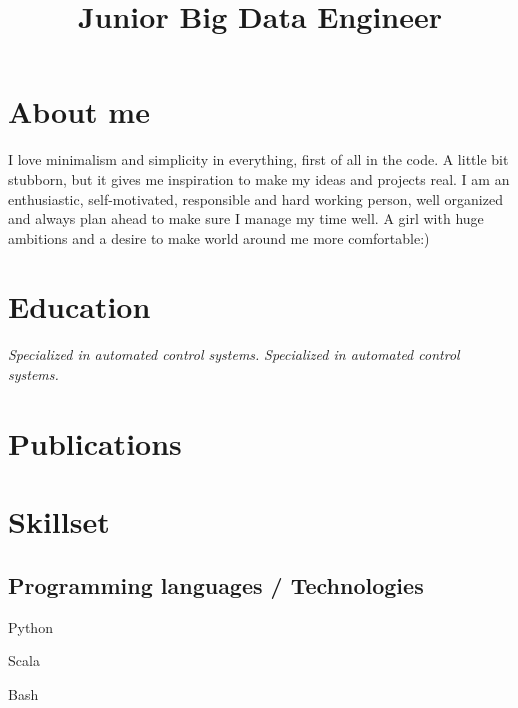 \documentclass[12pt,a4paper,sans]{moderncv}        %
\title{Junior Big Data Engineer}                               %
\begin{document}
\makecvtitle
\section{About me}
\textcolor{color1}{I love minimalism and simplicity in everything, first of all in the code. A little bit stubborn, but it gives me inspiration to make my ideas and projects real. I am an enthusiastic, self-motivated, responsible and hard working person, well organized and always plan ahead to make sure I manage my time well. A girl with huge ambitions and a desire to make world around me more comfortable:)}
\section{Education}
\textit{Specialized in automated control systems.}  %
\textit{Specialized in automated control systems.} 

\section{Publications}
\section{Skillset}

\subsection{Programming languages / Technologies}
\begin{itemize}
\begin{multicols}{2}
\item Python
\item Scala 
\item Bash 
\end{multicols}
\end{itemize}
\end{document}
